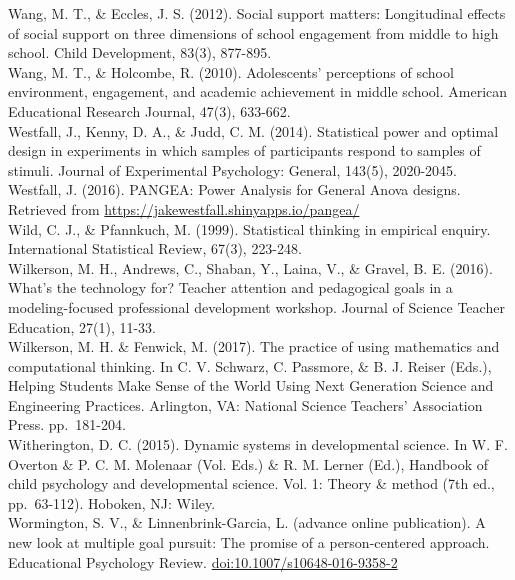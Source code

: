 \documentclass[]{msu-thesis}
\theoremstyle{definition}
\theoremstyle{definition}
\theoremstyle{definition}
\theoremstyle{remark}
\begin{document}
Wang, M. T., \& Eccles, J. S. (2012). Social support matters:
Longitudinal effects of social support on three dimensions of school
engagement from middle to high school. Child Development, 83(3),
877-895.\\
Wang, M. T., \& Holcombe, R. (2010). Adolescents' perceptions of school
environment, engagement, and academic achievement in middle school.
American Educational Research Journal, 47(3), 633-662.\\
Westfall, J., Kenny, D. A., \& Judd, C. M. (2014). Statistical power and
optimal design in experiments in which samples of participants respond
to samples of stimuli. Journal of Experimental Psychology: General,
143(5), 2020-2045.\\
Westfall, J. (2016). PANGEA: Power Analysis for General Anova designs.
Retrieved from \url{https://jakewestfall.shinyapps.io/pangea/}\\
Wild, C. J., \& Pfannkuch, M. (1999). Statistical thinking in empirical
enquiry. International Statistical Review, 67(3), 223-248.\\
Wilkerson, M. H., Andrews, C., Shaban, Y., Laina, V., \& Gravel, B. E.
(2016). What's the technology for? Teacher attention and pedagogical
goals in a modeling-focused professional development workshop. Journal
of Science Teacher Education, 27(1), 11-33.\\
Wilkerson, M. H. \& Fenwick, M. (2017). The practice of using
mathematics and computational thinking. In C. V. Schwarz, C. Passmore,
\& B. J. Reiser (Eds.), Helping Students Make Sense of the World Using
Next Generation Science and Engineering Practices. Arlington, VA:
National Science Teachers' Association Press. pp.~181-204.\\
Witherington, D. C. (2015). Dynamic systems in developmental science. In
W. F. Overton \& P. C. M. Molenaar (Vol. Eds.) \& R. M. Lerner (Ed.),
Handbook of child psychology and developmental science. Vol. 1: Theory
\& method (7th ed., pp.~63-112). Hoboken, NJ: Wiley.\\
Wormington, S. V., \& Linnenbrink-Garcia, L. (advance online
publication). A new look at multiple goal pursuit: The promise of a
person-centered approach. Educational Psychology Review.
\url{doi:10.1007/s10648-016-9358-2}


\end{document}
